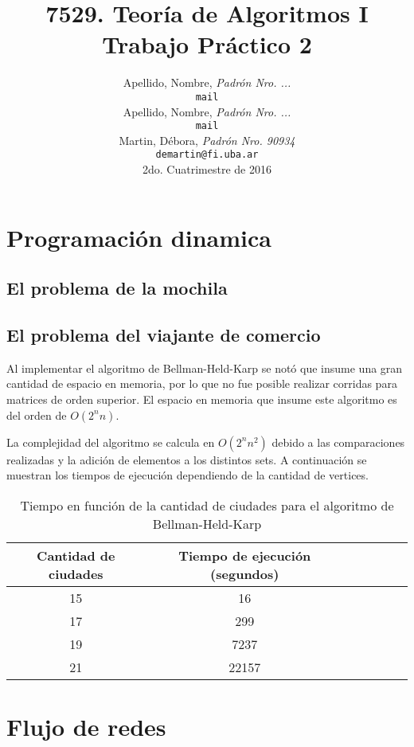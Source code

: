 \documentclass[a4paper,10pt]{article}
\title{ \textbf{ 7529. Teoría de Algoritmos I\\
Trabajo Práctico 2}}
\author{ Apellido, Nombre, \textit{Padrón Nro. ...} \\
\texttt{ mail } \\[2.5ex]
Apellido, Nombre, \textit{Padrón Nro. ...} \\
\texttt{ mail } \\[2.5ex]
Martin, Débora, \textit{Padrón Nro. 90934} \\
\texttt{ demartin@fi.uba.ar } \\[2.5ex]
\normalsize{2do. Cuatrimestre de 2016} \\
}
\date{}
\begin{document}
\maketitle
\thispagestyle{empty} %
\setcounter{page}{0}
\newpage
\tableofcontents

\newpage

\section{Programación dinamica}


\subsection{El problema de la mochila}






\subsection{El problema del viajante de comercio}
Al implementar el algoritmo de Bellman-Held-Karp se notó que insume una gran cantidad de espacio en memoria, por lo que no fue posible realizar corridas para matrices de orden superior. El espacio en memoria que insume este algoritmo es del orden de $O(2^n n)$.

La complejidad del algoritmo se calcula en $O(2^n n^2)$ debido a las comparaciones realizadas y la adición de elementos a los distintos sets. A continuación se muestran los tiempos de ejecución dependiendo de la cantidad de vertices.

\begin{table}[H]
\centering
\begin{tabular}{|c|c|c|c|c|c|c|}
\hline
Cantidad de ciudades	& Tiempo de ejecución (segundos)\\\hline
15						& 16\\\hline
17						& 299\\\hline
19						& 7237\\\hline
21						& 22157\\\hline
\end{tabular}
\caption{Tiempo en función de la cantidad de ciudades para el algoritmo de Bellman-Held-Karp}
\label{tab:held}
\end{table}



\section{Flujo de redes}
\end{document}
